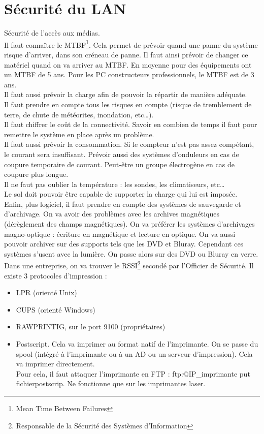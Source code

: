 \section{Sécurité du LAN}
Sécurité de l'accès aux médias.\\
Il faut connaître le MTBF\footnote{Mean Time Between Failures}. Cela permet de prévoir quand une panne du système risque d'arriver, dans son créneau de panne. Il faut ainsi prévoir de changer ce matériel quand on va arriver au MTBF. En moyenne pour des équipements ont un MTBF de 5 ans. Pour les PC constructeurs professionnels, le MTBF est de 3 ans.\\
Il faut aussi prévoir la charge afin de pouvoir la répartir de manière adéquate.\\
Il faut prendre en compte tous les risques en compte (risque de tremblement de terre, de chute de météorites, inondation, etc\ldots).\\
Il faut chiffrer le coût de la connectivité. Savoir en combien de temps il faut pour remettre le système en place après un problème.\\
Il faut aussi prévoir la consommation. Si le compteur n'est pas assez compétant, le courant sera insuffisant. Prévoir aussi des systèmes d'onduleurs en cas de coupure temporaire de courant. Peut-être un groupe électrogène en cas de coupure plus longue.\\
Il ne faut pas oublier la température : les sondes, les climatiseurs, etc\ldots\\
Le sol doit pouvoir être capable de supporter la charge qui lui est imposée.\\
Enfin, plus logiciel, il faut prendre en compte des systèmes de sauvegarde et d'archivage. On va avoir des problèmes avec les archives magnétiques (dérèglement des champs magnétiques). On va préférer les systèmes d'archivages magno-optique : écriture en magnétique et lecture en optique. On va aussi pouvoir archiver sur des supports tels que les DVD et Bluray. Cependant ces systèmes s'usent avec la lumière. On passe alors sur des DVD ou Bluray en verre.\\
Dans une entreprise, on va trouver le RSSI\footnote{Responsable de la Sécurité des Systèmes d'Information} secondé par l'Officier de Sécurité.
Il existe 3 protocoles d'impression :
\begin{itemize}
 \item LPR (orienté Unix)
 \item CUPS (orienté Windows)
 \item RAWPRINTIG, sur le port 9100 (propriétaires)
 \item Postscript. Cela va imprimer au format natif de l'imprimante. On se passe du spool (intégré à l'imprimante ou à un AD ou un serveur d'impression). Cela va imprimer directement.\\Pour cela, il faut attaquer l'imprimante en FTP : ftp:@IP\_imprimante put fichierpostscrip. Ne fonctionne que sur les imprimantes laser.
\end{itemize}
\newpage
